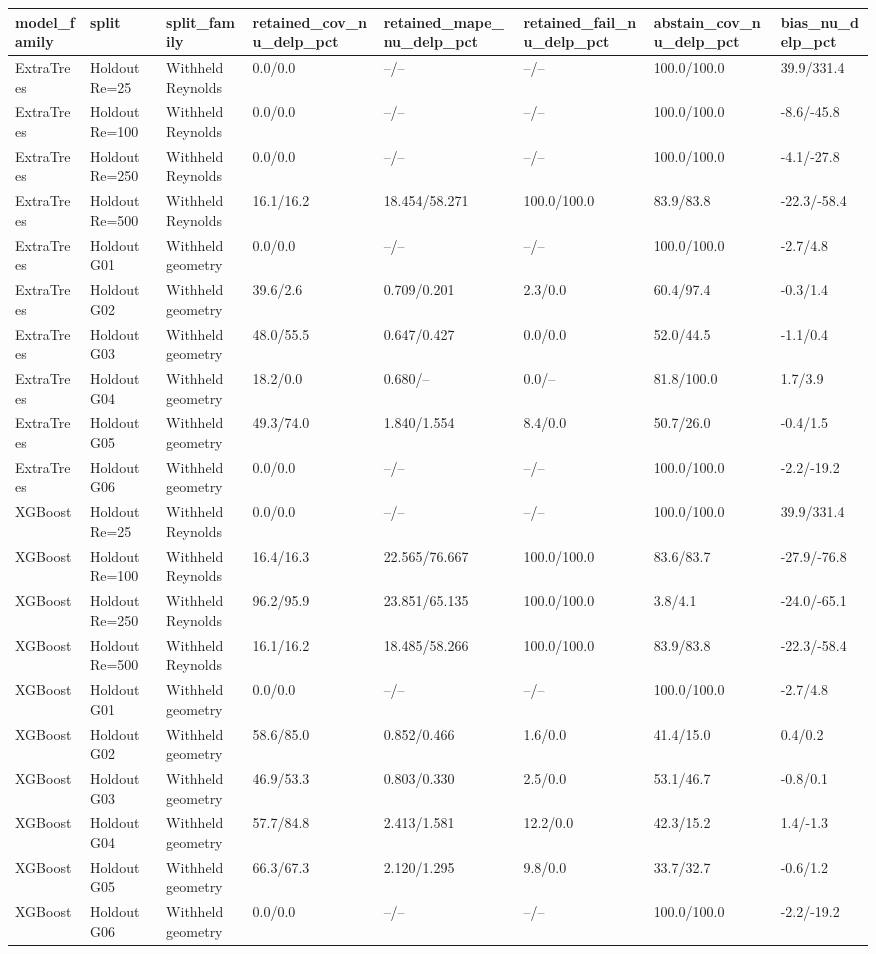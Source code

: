 \begin{tabular}{llllllll}
\hline
model_family & split & split_family & retained_cov_nu_delp_pct & retained_mape_nu_delp_pct & retained_fail_nu_delp_pct & abstain_cov_nu_delp_pct & bias_nu_delp_pct \\
\hline
ExtraTrees & Holdout Re=25 & Withheld Reynolds & 0.0/0.0 & --/-- & --/-- & 100.0/100.0 & 39.9/331.4 \\
ExtraTrees & Holdout Re=100 & Withheld Reynolds & 0.0/0.0 & --/-- & --/-- & 100.0/100.0 & -8.6/-45.8 \\
ExtraTrees & Holdout Re=250 & Withheld Reynolds & 0.0/0.0 & --/-- & --/-- & 100.0/100.0 & -4.1/-27.8 \\
ExtraTrees & Holdout Re=500 & Withheld Reynolds & 16.1/16.2 & 18.454/58.271 & 100.0/100.0 & 83.9/83.8 & -22.3/-58.4 \\
ExtraTrees & Holdout G01 & Withheld geometry & 0.0/0.0 & --/-- & --/-- & 100.0/100.0 & -2.7/4.8 \\
ExtraTrees & Holdout G02 & Withheld geometry & 39.6/2.6 & 0.709/0.201 & 2.3/0.0 & 60.4/97.4 & -0.3/1.4 \\
ExtraTrees & Holdout G03 & Withheld geometry & 48.0/55.5 & 0.647/0.427 & 0.0/0.0 & 52.0/44.5 & -1.1/0.4 \\
ExtraTrees & Holdout G04 & Withheld geometry & 18.2/0.0 & 0.680/-- & 0.0/-- & 81.8/100.0 & 1.7/3.9 \\
ExtraTrees & Holdout G05 & Withheld geometry & 49.3/74.0 & 1.840/1.554 & 8.4/0.0 & 50.7/26.0 & -0.4/1.5 \\
ExtraTrees & Holdout G06 & Withheld geometry & 0.0/0.0 & --/-- & --/-- & 100.0/100.0 & -2.2/-19.2 \\
XGBoost & Holdout Re=25 & Withheld Reynolds & 0.0/0.0 & --/-- & --/-- & 100.0/100.0 & 39.9/331.4 \\
XGBoost & Holdout Re=100 & Withheld Reynolds & 16.4/16.3 & 22.565/76.667 & 100.0/100.0 & 83.6/83.7 & -27.9/-76.8 \\
XGBoost & Holdout Re=250 & Withheld Reynolds & 96.2/95.9 & 23.851/65.135 & 100.0/100.0 & 3.8/4.1 & -24.0/-65.1 \\
XGBoost & Holdout Re=500 & Withheld Reynolds & 16.1/16.2 & 18.485/58.266 & 100.0/100.0 & 83.9/83.8 & -22.3/-58.4 \\
XGBoost & Holdout G01 & Withheld geometry & 0.0/0.0 & --/-- & --/-- & 100.0/100.0 & -2.7/4.8 \\
XGBoost & Holdout G02 & Withheld geometry & 58.6/85.0 & 0.852/0.466 & 1.6/0.0 & 41.4/15.0 & 0.4/0.2 \\
XGBoost & Holdout G03 & Withheld geometry & 46.9/53.3 & 0.803/0.330 & 2.5/0.0 & 53.1/46.7 & -0.8/0.1 \\
XGBoost & Holdout G04 & Withheld geometry & 57.7/84.8 & 2.413/1.581 & 12.2/0.0 & 42.3/15.2 & 1.4/-1.3 \\
XGBoost & Holdout G05 & Withheld geometry & 66.3/67.3 & 2.120/1.295 & 9.8/0.0 & 33.7/32.7 & -0.6/1.2 \\
XGBoost & Holdout G06 & Withheld geometry & 0.0/0.0 & --/-- & --/-- & 100.0/100.0 & -2.2/-19.2 \\
\hline
\end{tabular}
